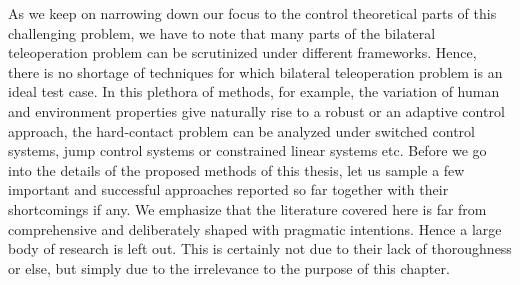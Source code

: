 As we keep on narrowing down our focus to the control theoretical parts of this challenging problem, we have to 
note that many parts of the bilateral teleoperation problem can be scrutinized under different frameworks. 
Hence, there is no shortage of techniques for which bilateral teleoperation problem is an ideal 
test case. In this plethora of methods, for example, the variation of human and environment properties give 
naturally rise to a robust or an adaptive control approach, the hard-contact problem can be analyzed under 
switched control systems, jump control systems or constrained linear systems etc. Before we go into the 
details of the proposed methods of this thesis, let us sample a few important and successful approaches 
reported so far together with their shortcomings if any. We emphasize that the literature covered here is 
far from comprehensive and deliberately shaped with pragmatic intentions. Hence a large body of research is 
left out. This is certainly not due to their lack of thoroughness or else, but simply due to the irrelevance 
to the purpose of this chapter.


